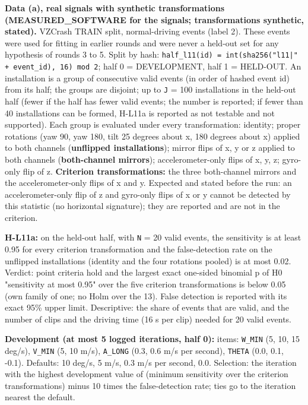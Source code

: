 \textbf{Data (a), real signals with synthetic transformations (MEASURED\_SOFTWARE for the signals; transformations synthetic, stated).} VZCrash TRAIN split, normal-driving events (label 2). These events were used for fitting in earlier rounds and were never a held-out set for any hypothesis of rounds 3 to 5. Split by hash: \texttt{half\_l11(id) = int(sha256("l11|" + event\_id), 16) mod 2}; half 0 = DEVELOPMENT, half 1 = HELD-OUT. An installation is a group of consecutive valid events (in order of hashed event id) from its half; the groups are disjoint; up to \texttt{J} = 100 installations in the held-out half (fewer if the half has fewer valid events; the number is reported; if fewer than 40 installations can be formed, H-L11a is reported as not testable and not supported). Each group is evaluated under every transformation: identity; proper rotations (yaw 90, yaw 180, tilt 25 degrees about x, 180 degrees about x) applied to both channels (\textbf{unflipped installations}); mirror flips of x, y or z applied to both channels (\textbf{both-channel mirrors}); accelerometer-only flips of x, y, z; gyro-only flip of z. \textbf{Criterion transformations:} the three both-channel mirrors and the accelerometer-only flips of x and y. Expected and stated before the run: an accelerometer-only flip of z and gyro-only flips of x or y cannot be detected by this statistic (no horizontal signature); they are reported and are not in the criterion.

\textbf{H-L11a:} on the held-out half, with \texttt{N} = 20 valid events, the sensitivity is at least 0.95 for every criterion transformation and the false-detection rate on the unflipped installations (identity and the four rotations pooled) is at most 0.02. Verdict: point criteria hold and the largest exact one-sided binomial p of H0 "sensitivity at most 0.95" over the five criterion transformations is below 0.05 (own family of one; no Holm over the 13). False detection is reported with its exact 95\% upper limit. Descriptive: the share of events that are valid, and the number of clips and the driving time (16 s per clip) needed for 20 valid events.

\textbf{Development (at most 5 logged iterations, half 0):} items: \texttt{W\_MIN} (5, 10, 15 deg/s), \texttt{V\_MIN} (5, 10 m/s), \texttt{A\_LONG} (0.3, 0.6 m/s per second), \texttt{THETA} (0.0, 0.1, -0.1). Defaults: 10 deg/s, 5 m/s, 0.3 m/s per second, 0.0. Selection: the iteration with the highest development value of (minimum sensitivity over the criterion transformations) minus 10 times the false-detection rate; ties go to the iteration nearest the default.

